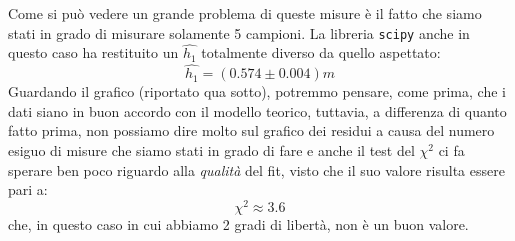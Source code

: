 \documentclass{article}
\begin{document}
\noindent Come si può vedere un grande problema di queste misure è il fatto che siamo stati in grado di misurare solamente 5 campioni. La libreria \texttt{scipy} anche in questo caso ha restituito un $\hat{h_1}$ totalmente diverso da quello aspettato:
\begin{equation}
	\hat{h_1} = (0.574 \pm 0.004) \unit{m}
\end{equation}
Guardando il grafico (riportato qua sotto), potremmo pensare, come prima, che i dati siano in buon accordo con il modello teorico, tuttavia, a differenza di quanto fatto prima, non possiamo dire molto  sul grafico dei residui a causa del numero esiguo di misure che siamo stati in grado di fare e anche il test del $\chi^2$ ci fa sperare ben poco riguardo alla \emph{qualità} del fit, visto che il suo valore risulta essere pari a: \\
\begin{equation}
	\chi^2 \approx 3.6
\end{equation}
che, in questo caso in cui abbiamo 2 gradi di libertà, non è un buon valore.
\\
\end{document}
